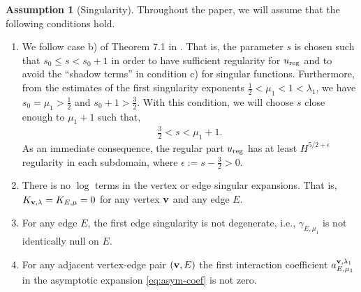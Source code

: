 ﻿\documentclass[11pt,reqno,oneside]{amsart}
\theoremstyle{definition}
\newtheorem{assumption}[theorem]{Assumption}
\theoremstyle{remark}
\newcommand{\g}{\gamma}
\newcommand{\lm}{\lambda}
\begin{document}
    \begin{assumption}[Singularity]\label{assumption:singularity}
        Throughout the paper, we will assume that the following conditions hold.
    \begin{enumerate}
        \item  We follow case b) of Theorem 7.1 in \cite{Dauge1999}. That is, the parameter $s$ is chosen such that $s_0\leq s <s_0+1$ in order to have sufficient regularity for $u_{\rm reg}$ and to avoid the ``shadow terms'' in condition c) for singular functions. Furthermore, from the estimates of the first singularity exponents $\frac{1}{2}<\mu_1<1<\lm_1$, we have $s_0=\mu_1>\frac{1}{2}$ and $s_0+1>\frac{3}{2}$. With this condition, we will choose $s$ close enough to $\mu_1+1$ such that,
        \begin{align*}
            \frac{3}{2}< s <\mu_1+1.
        \end{align*}
        As an immediate consequence, the regular part $u_{\rm reg}$ has at least $H^{5/2+\epsilon}$ regularity in each subdomain, where $\epsilon:=s-\frac{3}{2}>0$.
        \item There is no $\log$ terms in the vertex or edge singular expansions. That is, $K_{\bf v,\lm}=K_{E,\mu}=0$ for any vertex $\bf v$ and any edge $E$.
        \item For any edge $E$, the first edge singularity is not degenerate, i.e., $\g_{E,\mu_1}$ is not identically null on $E$.
        \item For any adjacent vertex-edge pair $({\bf v}, E)$ the first interaction coefficient $a_{E,\mu_1}^{{\bf v},\lm_1}$ in the asymptotic expansion \eqref{eq:asym-coef} is not zero.
    \end{enumerate}
    \end{assumption}
\end{document}

